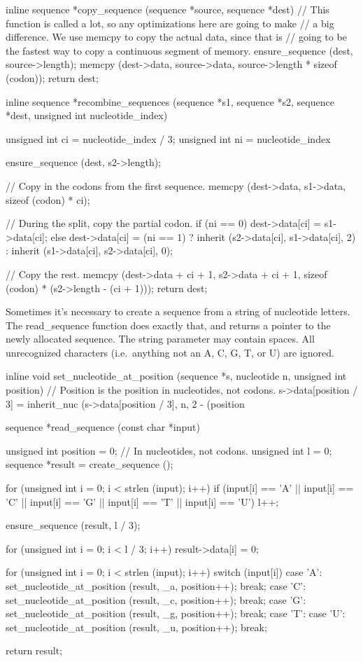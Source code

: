 \documentclass{article}
\begin{document}
\begin{ccode}
inline sequence *copy_sequence (sequence *source, sequence *dest) {
  // This function is called a lot, so any optimizations here are going to make
  // a big difference. We use memcpy to copy the actual data, since that is
  // going to be the fastest way to copy a continuous segment of memory.
  ensure_sequence (dest, source->length);
  memcpy (dest->data, source->data, source->length * sizeof (codon));
  return dest;
}

inline sequence *recombine_sequences (sequence *s1, sequence *s2, sequence *dest,
				      unsigned int nucleotide_index) {
  unsigned int ci = nucleotide_index / 3;
  unsigned int ni = nucleotide_index %

  ensure_sequence (dest, s2->length);

  // Copy in the codons from the first sequence.
  memcpy (dest->data, s1->data, sizeof (codon) * ci);

  // During the split, copy the partial codon.
  if (ni == 0)
    dest->data[ci] = s1->data[ci];
  else
    dest->data[ci] = (ni == 1) ? inherit (s2->data[ci], s1->data[ci], 2) :
				 inherit (s1->data[ci], s2->data[ci], 0);

  // Copy the rest.
  memcpy (dest->data + ci + 1, s2->data + ci + 1, sizeof (codon) * (s2->length - (ci + 1)));
  return dest;
}
\end{ccode}

      Sometimes it’s necessary to create a sequence from a string of nucleotide
      letters. The read_sequence function does exactly that, and returns a
      pointer to the newly allocated sequence. The string parameter may contain
      spaces. All unrecognized characters (i.e.\ anything not an A, C, G, T, or
	  U) are ignored.

\begin{ccode}
inline void set_nucleotide_at_position (sequence *s, nucleotide n, unsigned int position) {
  // Position is the position in nucleotides, not codons.
  s->data[position / 3] = inherit_nuc (s->data[position / 3], n, 2 - (position %
}

sequence *read_sequence (const char *input) {
  unsigned int position = 0; // In nucleotides, not codons.
  unsigned int l   	= 0;
  sequence *result 	= create_sequence ();

  for (unsigned int i = 0; i < strlen (input); i++)
    if (input[i] == ’A’ || input[i] == ’C’ || input[i] == ’G’ ||
	input[i] == ’T’ || input[i] == ’U’)
      l++;

  ensure_sequence (result, l / 3);

  for (unsigned int i = 0; i < l / 3; i++)
    result->data[i] = 0;

  for (unsigned int i = 0; i < strlen (input); i++)
    switch (input[i]) {
      case ’A’: set_nucleotide_at_position (result, _a, position++); break;
      case ’C’: set_nucleotide_at_position (result, _c, position++); break;
      case ’G’: set_nucleotide_at_position (result, _g, position++); break;
      case ’T’:
      case ’U’: set_nucleotide_at_position (result, _u, position++); break;
    }

  return result;
}
\end{ccode}
\end{document}
